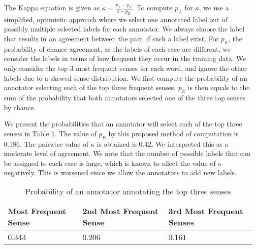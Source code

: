 {The Kappa equation is given as 
$\kappa = \frac{p_A - p_E}{1 - p_E} $.
To compute $p_A$ for $\kappa$, we use a simplified, optimistic approach where we select one annotated label out of possibly multiple selected labels for each annotator. We always choose the label that results in an agreement between the pair, if such a label exist. For $p_E$, the probability of chance agreement, as the labels of each case are different, we consider the labels in terms of how frequent they occur in the training data. We only consider the top 3 most frequent senses for each word, and ignore the other labels due to a skewed sense distribution. We first compute the probability of an annotator selecting each of the top three frequent senses, $p_E$ is then equals to the sum of the probability that both annotators selected one of the three top senses by chance. 

We present the probabilities that an annotator will select each of the top three senses in Table \ref{table:IAA}. The value of $p_E$ by this proposed method of computation is 0.186. The pairwise value of $\kappa$ is obtained is 0.42. We interpreted this as a moderate level of agreement. We note that the number of possible labels that can be assigned to each case is large, which is known to affect the value of $\kappa$ negatively. This is worsened since we allow the annotators to add new labels. 

\begin{table}[ht]
	\caption{Probability of an annotator annotating the top three senses}
	\label{table:IAA}
	\begin{center}
		\begin{tabular}{| p{4cm} | p{4cm}  | p{4cm} | }
			\hline
			Most Frequent Sense & 2nd Most Frequent Sense & 3rd Most Frequent Senses\\
			\hline
			0.343 & 0.206 & 0.161\\						
			
			\hline
		\end{tabular}
	\end{center}
\end{table}

}
